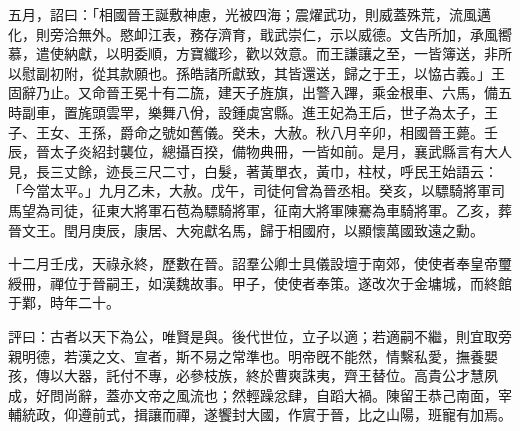 \begin{pinyinscope}
 
 五月，詔曰：「相國晉王誕敷神慮，光被四海；震燿武功，則威蓋殊荒，流風邁化，則旁洽無外。愍卹江表，務存濟育，戢武崇仁，示以威德。文告所加，承風嚮慕，遣使納獻，以明委順，方寶纖珍，歡以效意。而王謙讓之至，一皆簿送，非所以慰副初附，從其款願也。孫皓諸所獻致，其皆還送，歸之于王，以恊古義。」王固辭乃止。又命晉王冕十有二旒，建天子旌旗，出警入蹕，乘金根車、六馬，備五時副車，置旄頭雲䍐，樂舞八佾，設鍾虡宮縣。進王妃為王后，世子為太子，王子、王女、王孫，爵命之號如舊儀。癸未，大赦。秋八月辛卯，相國晉王薨。壬辰，晉太子炎紹封襲位，總攝百揆，備物典冊，一皆如前。是月，襄武縣言有大人見，長三丈餘，迹長三尺二寸，白髮，著黃單衣，黃巾，柱杖，呼民王始語云：「今當太平。」九月乙未，大赦。戊午，司徒何曾為晉丞相。癸亥，以驃騎將軍司馬望為司徒，征東大將軍石苞為驃騎將軍，征南大將軍陳騫為車騎將軍。乙亥，葬晉文王。閏月庚辰，康居、大宛獻名馬，歸于相國府，以顯懷萬國致遠之勳。
 
 
十二月壬戌，天祿永終，歷數在晉。詔羣公卿士具儀設壇于南郊，使使者奉皇帝璽綬冊，禪位于晉嗣王，如漢魏故事。甲子，使使者奉策。遂改次于金墉城，而終館于鄴，時年二十。
 
 
 
 
 評曰：古者以天下為公，唯賢是與。後代世位，立子以適；若適嗣不繼，則宜取旁親明德，若漢之文、宣者，斯不易之常準也。明帝旣不能然，情繫私愛，撫養嬰孩，傳以大器，託付不專，必參枝族，終於曹爽誅夷，齊王替位。高貴公才慧夙成，好問尚辭，蓋亦文帝之風流也；然輕躁忿肆，自蹈大禍。陳留王恭己南面，宰輔統政，仰遵前式，揖讓而禪，遂饗封大國，作賔于晉，比之山陽，班寵有加焉。
 
 
\end{pinyinscope}